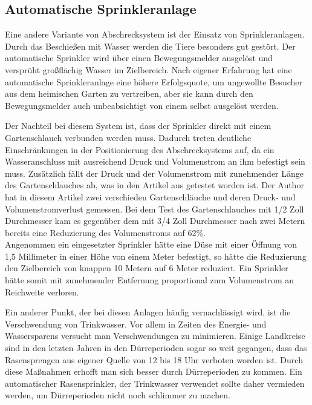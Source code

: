 \subsection{Automatische Sprinkleranlage} \label{sprinkler}

Eine andere Variante von Abschrecksystem ist der Einsatz von Sprinkleranlagen. Durch das Beschießen mit Wasser werden die Tiere besonders gut gestört. Der automatische Sprinkler wird über einen Bewegungsmelder ausgelöst und versprüht großflächig Wasser im Zielbereich. Nach eigener Erfahrung hat eine automatische Sprinkleranlage eine höhere Erfolgsquote, um ungewollte Besucher aus dem heimischen Garten zu vertreiben, aber sie kann durch den Bewegungsmelder auch unbeabsichtigt von einem selbst ausgelöst werden.\cite{anti_wasch}

Der Nachteil bei diesem System ist, dass der Sprinkler direkt mit einem Gartenschlauch verbunden werden muss. Dadurch treten deutliche Einschränkungen in der Positionierung des Abschrecksystems auf, da ein Wasseranschluss mit ausreichend Druck und Volumenstrom an ihm befestigt sein muss. Zusätzlich fällt der Druck und der Volumenstrom mit zunehmender Länge des Gartenschlauches ab, was in den Artikel aus \cite{bewaesserung_foerderverlust} getestet worden ist. Der Author hat in diesem Artikel zwei verschieden Gartenschläuche und deren Druck- und Volumenstromverlust gemessen. Bei dem Test des Gartenschlauches mit 1/2 Zoll Durchmesser kam es gegenüber dem mit 3/4 Zoll Durchmesser nach zwei Metern bereits eine Reduzierung des Volumenstroms auf 62\%.\\

Angenommen ein eingesetzter Sprinkler hätte eine Düse mit einer Öffnung von 1,5 Millimeter in einer Höhe von einem Meter befestigt, so hätte die Reduzierung den Zielbereich von knappen 10 Metern auf 6 Meter reduziert.
Ein Sprinkler hätte somit mit zunehmender Entfernung proportional zum Volumenstrom an Reichweite verloren.

Ein anderer Punkt, der bei diesen Anlagen häufig vernachlässigt wird, ist die Verschwendung von Trinkwasser. Vor allem in Zeiten des Energie- und Wassersparens versucht man Verschwendungen zu minimieren. Einige Landkreise sind in den letzten Jahren in den Dürreperioden sogar so weit gegangen, dass das Rasensprengen aus eigener Quelle von 12 bis 18 Uhr verboten worden ist. Durch diese Maßnahmen erhofft man sich besser durch Dürreperioden zu kommen. Ein automatischer Rasensprinkler, der Trinkwasser verwendet sollte daher vermieden werden, um Dürreperioden nicht noch schlimmer zu machen.\cite{wasser_verbot}

